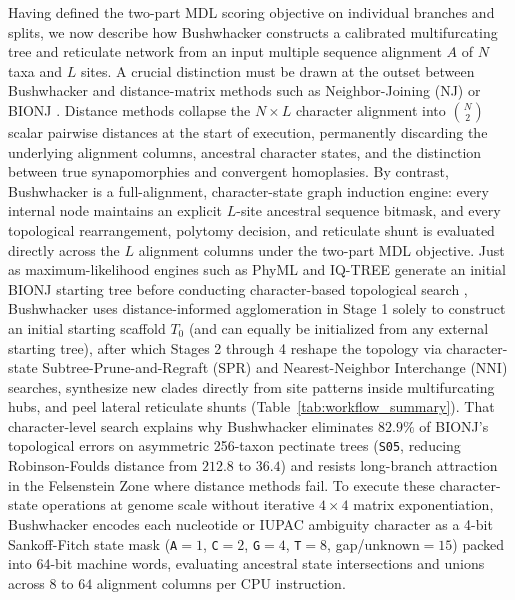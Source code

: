 \documentclass[11pt,a4paper]{article}
\begin{document}
Having defined the two-part MDL scoring objective on individual branches and splits, we now describe how Bushwhacker constructs a calibrated multifurcating tree and reticulate network from an input multiple sequence alignment $A$ of $N$ taxa and $L$ sites. A crucial distinction must be drawn at the outset between Bushwhacker and distance-matrix methods such as Neighbor-Joining (NJ) or BIONJ \citep{saitou1987neighbor,gascuel1997bionj}. Distance methods collapse the $N \times L$ character alignment into $\binom{N}{2}$ scalar pairwise distances at the start of execution, permanently discarding the underlying alignment columns, ancestral character states, and the distinction between true synapomorphies and convergent homoplasies. By contrast, Bushwhacker is a full-alignment, character-state graph induction engine: every internal node maintains an explicit $L$-site ancestral sequence bitmask, and every topological rearrangement, polytomy decision, and reticulate shunt is evaluated directly across the $L$ alignment columns under the two-part MDL objective. Just as maximum-likelihood engines such as PhyML and IQ-TREE generate an initial BIONJ starting tree before conducting character-based topological search \citep{guindon2010new,minh2020iqtree}, Bushwhacker uses distance-informed agglomeration in Stage 1 solely to construct an initial starting scaffold $T_0$ (and can equally be initialized from any external starting tree), after which Stages 2 through 4 reshape the topology via character-state Subtree-Prune-and-Regraft (SPR) and Nearest-Neighbor Interchange (NNI) searches, synthesize new clades directly from site patterns inside multifurcating hubs, and peel lateral reticulate shunts (Table~\ref{tab:workflow_summary}). That character-level search explains why Bushwhacker eliminates $82.9\%$ of BIONJ's topological errors on asymmetric 256-taxon pectinate trees (\texttt{S05}, reducing Robinson-Foulds distance from $212.8$ to $36.4$) and resists long-branch attraction in the Felsenstein Zone where distance methods fail. To execute these character-state operations at genome scale without iterative $4 \times 4$ matrix exponentiation, Bushwhacker encodes each nucleotide or IUPAC ambiguity character as a 4-bit Sankoff-Fitch state mask (\texttt{A}$=1$, \texttt{C}$=2$, \texttt{G}$=4$, \texttt{T}$=8$, gap/unknown$=15$) packed into 64-bit machine words, evaluating ancestral state intersections and unions across $8$ to $64$ alignment columns per CPU instruction.
\end{document}
